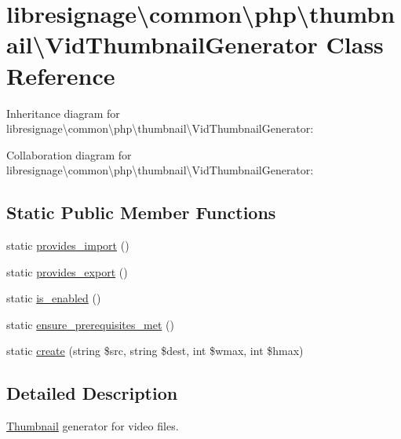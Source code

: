 \hypertarget{classlibresignage_1_1common_1_1php_1_1thumbnail_1_1VidThumbnailGenerator}{}\section{libresignage\textbackslash{}common\textbackslash{}php\textbackslash{}thumbnail\textbackslash{}Vid\+Thumbnail\+Generator Class Reference}
\label{classlibresignage_1_1common_1_1php_1_1thumbnail_1_1VidThumbnailGenerator}


Inheritance diagram for libresignage\textbackslash{}common\textbackslash{}php\textbackslash{}thumbnail\textbackslash{}Vid\+Thumbnail\+Generator\+:


Collaboration diagram for libresignage\textbackslash{}common\textbackslash{}php\textbackslash{}thumbnail\textbackslash{}Vid\+Thumbnail\+Generator\+:
\subsection*{Static Public Member Functions}
\begin{DoxyCompactItemize}
\item 
static \hyperlink{classlibresignage_1_1common_1_1php_1_1thumbnail_1_1VidThumbnailGenerator_ac425e90b4944a08c887d99d5cc72f3ff}{provides\+\_\+import} ()
\item 
static \hyperlink{classlibresignage_1_1common_1_1php_1_1thumbnail_1_1VidThumbnailGenerator_a068f440ec5762055c439534a93a01ce1}{provides\+\_\+export} ()
\item 
static \hyperlink{classlibresignage_1_1common_1_1php_1_1thumbnail_1_1VidThumbnailGenerator_a3e150948c4ddbef581323761416872f6}{is\+\_\+enabled} ()
\item 
static \hyperlink{classlibresignage_1_1common_1_1php_1_1thumbnail_1_1VidThumbnailGenerator_a8c1e2627c46e1e14db021d803b610773}{ensure\+\_\+prerequisites\+\_\+met} ()
\item 
static \hyperlink{classlibresignage_1_1common_1_1php_1_1thumbnail_1_1VidThumbnailGenerator_a175338bc954004ef585a4cafd21bbb98}{create} (string \$src, string \$dest, int \$wmax, int \$hmax)
\end{DoxyCompactItemize}


\subsection{Detailed Description}
\hyperlink{classlibresignage_1_1common_1_1php_1_1thumbnail_1_1Thumbnail}{Thumbnail} generator for video files.


